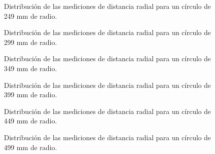 \begin{figure}[H]
	\centering
	\caption{Distribución de las mediciones de distancia radial para un círculo de 249 mm de radio.}
	\label{fig:histograma_dists3}
\end{figure}

\begin{figure}[H]
	\centering
	\caption{Distribución de las mediciones de distancia radial para un círculo de 299 mm de radio.}
	\label{fig:histograma_dists4}
\end{figure}

\begin{figure}[H]
	\centering
	\caption{Distribución de las mediciones de distancia radial para un círculo de 349 mm de radio.}
	\label{fig:histograma_dists5}
\end{figure}

\begin{figure}[H]
	\centering
	\caption{Distribución de las mediciones de distancia radial para un círculo de 399 mm de radio.}
	\label{fig:histograma_dists6}
\end{figure}

\begin{figure}[H]
	\centering
	\caption{Distribución de las mediciones de distancia radial para un círculo de 449 mm de radio.}
	\label{fig:histograma_dists7}
\end{figure}

\begin{figure}[H]
	\centering
	\caption{Distribución de las mediciones de distancia radial para un círculo de 499 mm de radio.}
	\label{fig:histograma_dists8}
\end{figure}

